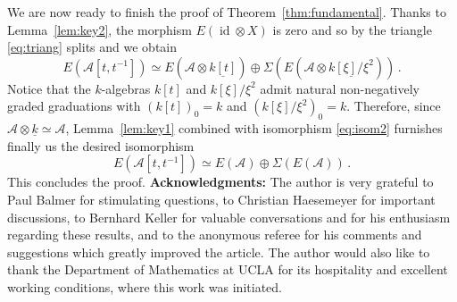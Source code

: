 \documentclass{amsart}
\numberwithin{equation}{subsection}
\theoremstyle{remark}
\theoremstyle{remark}
\theoremstyle{remark}
\theoremstyle{remark}
\begin{document}
We are now ready to finish the proof of Theorem~\ref{thm:fundamental}. Thanks to Lemma~\ref{lem:key2}, the morphism $E(\operatorname{id} \otimes X)$ is zero and so by \cite[Corollary~1.2.7]{Neeman} the triangle \eqref{eq:triang} splits and we obtain
\begin{equation}\label{eq:isom2}
E({{\mathcal A}}[t,t^{-1}]) \simeq E({{\mathcal A}} \otimes \underline{k[t]}) \oplus \Sigma(E({{\mathcal A}} \otimes \underline{k[\xi]/\xi^2}))\,.
\end{equation}
Notice that the $k$-algebras $k[t]$ and $k[\xi]/\xi^2$ admit natural non-negatively graded graduations with $(k[t])_0=k$ and $(k[\xi]/\xi^2)_0=k$. Therefore, since ${{\mathcal A}} \otimes \underline{k} \simeq {{\mathcal A}}$, Lemma~\ref{lem:key1} combined with isomorphism \eqref{eq:isom2} furnishes finally us the desired isomorphism
$$E({{\mathcal A}}[t,t^{-1}]) \simeq E({{\mathcal A}}) \oplus \Sigma(E({{\mathcal A}}))\,.$$
This concludes the proof.
\medbreak
\noindent\textbf{Acknowledgments:} The author is very grateful to Paul Balmer for stimulating questions, to Christian Haesemeyer for important discussions, to Bernhard Keller for valuable conversations and for his enthusiasm regarding these results, and to the anonymous referee for his comments and suggestions which greatly improved the article. The author would also like to thank the Department of Mathematics at UCLA for its hospitality and excellent working conditions, where this work was initiated.
\end{document}
